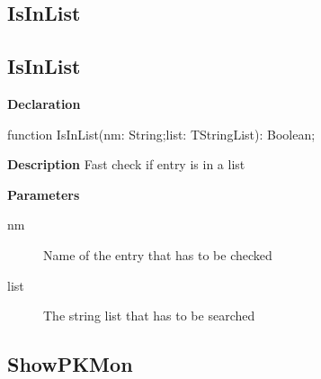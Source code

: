 \documentclass{report}
\newif\ifpdf
\begin{document}
\subsection*{\large{\textbf{IsInList}}\normalsize\hspace{1ex}\hrulefill}
\else
\subsection*{IsInList}
\fi
\label{licommon-IsInList}
\begin{list}{}{
\setlength{\itemindent}{0cm}
\setlength{\listparindent}{0cm}
\setlength{\leftmargin}{\evensidemargin}
\addtolength{\leftmargin}{\tmplength}
\settowidth{\labelsep}{X}
\addtolength{\leftmargin}{\labelsep}
\setlength{\labelwidth}{\tmplength}
}
\item[\textbf{Declaration}\hfill]
\ifpdf
\begin{flushleft}
\fi
\begin{ttfamily}
function IsInList(nm: String;list: TStringList): Boolean;\end{ttfamily}

\ifpdf
\end{flushleft}
\fi

\par
\item[\textbf{Description}]
Fast check if entry is in a list  \par
\item[\textbf{Parameters}]
\begin{description}
\item[nm] Name of the entry that has to be checked
\item[list] The string list that has to be searched
\end{description}


\end{list}
\ifpdf
\subsection*{\large{\textbf{ShowPKMon}}\normalsize\hspace{1ex}\hrulefill}
\else
\end{document}
